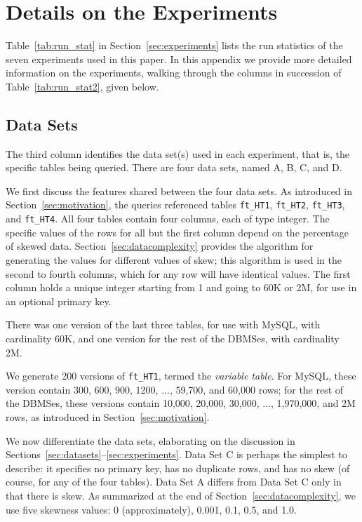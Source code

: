 \documentclass[prodmode,acmtods]{acmsmall}
\begin{document}
\newpage
\appendix
\section{Details on the Experiments}\label{sec:app}
Table~\ref{tab:run_stat} in Section~\ref{sec:experiments} lists the run statistics of the seven experiments
  used in this \hbox{paper}. In this appendix we provide more detailed information
  on the experiments, walking through the columns in succession of
Table~\ref{tab:run_stat2}, given below.

\subsection{Data Sets}\label{sec:appdatasets}
The third column identifies the data set(s) used in each experiment, that is, the
specific tables being queried. There are four data sets, named A, B, C, and
D.

We first discuss the features shared between the four data sets. As
introduced in Section~\ref{sec:motivation}, the queries referenced tables
{\tt ft\_HT1}, {\tt ft\_HT2}, {\tt ft\_HT3}, and {\tt ft\_HT4}. All four
tables contain four columns, each of type integer. The specific values of
the rows for all but the first column depend
on the percentage of skewed data. Section~\ref{sec:datacomplexity} provides
the algorithm for generating the values for different values of skew; this
algorithm is used in the second to fourth columns, which for any row will have
identical values. The first column holds a unique integer starting from 1
and going to 60K or 2M, for use in an optional primary key.

There was one version of the
last three tables, for use with MySQL, with cardinality 60K, and one version
for the rest of the DBMSes, with cardinality 2M.

We generate 200 versions of {\tt ft\_HT1}, termed the {\em variable table}. For MySQL, these version contain
300, 600, 900, 1200, $\ldots$, 59,700, and 60,000 rows; for the rest of the
DBMSes, these versions contain 10,000, 20,000, 30,000, $\ldots$, 1,970,000,
and 2M rows, as introduced in Section~\ref{sec:motivation}.

We now differentiate the data sets, elaborating on the discussion in Sections~\ref{sec:datasets}--\ref{sec:experiments}. Data Set C is perhaps the simplest to
describe: it specifies no primary key, has no duplicate rows, and has no skew
(of course, for any of the four tables). Data Set A differs from Data Set C
only in that there is skew.  As summarized at the end of
Section~\ref{sec:datacomplexity}, we use five skewness values: 0
(approximately), 0.001, 0.1, 0.5, and 1.0.
\end{document}
